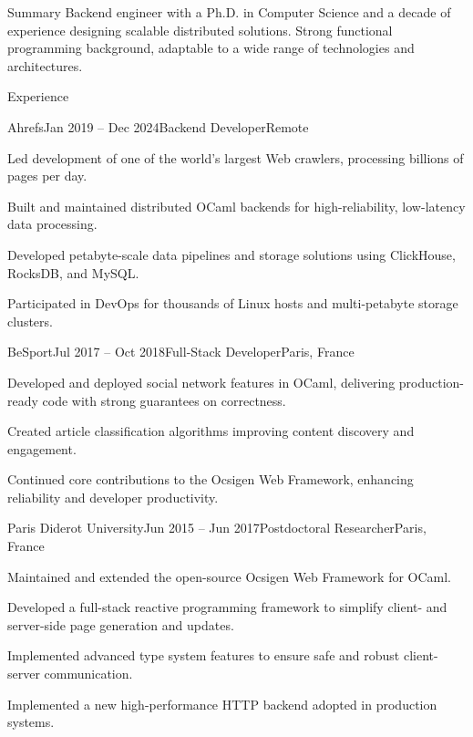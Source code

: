 \documentclass[11pt]{resume}
\begin{document}
\begin{rSection}{Summary}
Backend engineer with a Ph.D. in Computer Science and a decade of
experience designing scalable distributed solutions. Strong functional
programming background, adaptable to a wide range of technologies and
architectures.
\end{rSection}

\begin{rSection}{Experience}

  \begin{rSubsection}{Ahrefs}{Jan 2019 -- Dec 2024}{Backend
      Developer}{Remote}
  \item Led development of one of the world’s largest Web crawlers,
    processing billions of pages per day.
  \item Built and maintained distributed OCaml backends for
    high-reliability, low-latency data processing.
  \item Developed petabyte-scale data pipelines and storage solutions
    using ClickHouse, RocksDB, and MySQL.
  \item Participated in DevOps for thousands of Linux hosts and
    multi-petabyte storage clusters.
  \end{rSubsection}

  \begin{rSubsection}{BeSport}{Jul 2017 -- Oct 2018}{Full-Stack
      Developer}{Paris, France}
  \item Developed and deployed social network features in OCaml,
    delivering production-ready code with strong guarantees on
    correctness.
  \item Created article classification algorithms improving content
    discovery and engagement.
  \item Continued core contributions to the Ocsigen Web Framework,
    enhancing reliability and developer productivity.
  \end{rSubsection}

  \begin{rSubsection}{Paris Diderot University}{Jun 2015 -- Jun
      2017}{Postdoctoral Researcher}{Paris, France}
  \item Maintained and extended the open-source Ocsigen Web Framework
    for OCaml.
  \item Developed a full-stack reactive programming framework to
    simplify client- and server-side page generation and updates.
  \item Implemented advanced type system features to ensure safe and
    robust client-server communication.
  \item Implemented a new high-performance HTTP backend adopted in
    production systems.
  \end{rSubsection}

\end{rSection}
\end{document}
